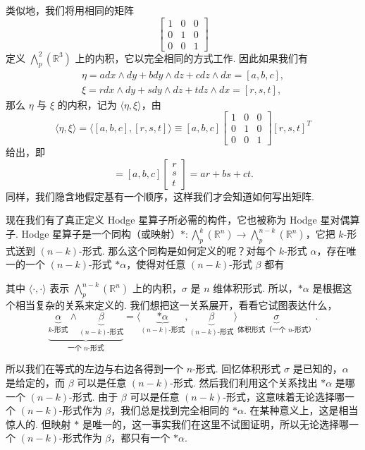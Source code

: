 类似地，我们将用相同的矩阵
\[
\begin{bmatrix}
1 & 0 & 0\\
0 & 1 & 0\\
0 & 0 & 1
\end{bmatrix}
\]
定义 $\bigwedge_p^2(\mathbb{R}^3)$ 上的内积，它以完全相同的方式工作. 因此如果我们有
\begin{align*}
\eta=adx\wedge dy+bdy\wedge dz+cdz\wedge dx=[a,b,c], \\
\xi=rdx\wedge dy+sdy\wedge dz+tdz\wedge dx=[r,s,t],
\end{align*}
那么 $\eta$ 与 $\xi$ 的内积，记为 $\langle\eta,\xi\rangle$，由
\[
\langle\eta,\xi\rangle=\langle[a,b,c],[r,s,t]\rangle
\equiv[a,b,c]
\begin{bmatrix}
1 & 0 & 0\\
0 & 1 & 0\\
0 & 0 & 1
\end{bmatrix}
[r,s,t]^T
\]
给出，即
\[
=[a,b,c]\begin{bmatrix}r\\s\\t\end{bmatrix}
=ar+bs+ct.
\]
同样，我们隐含地假定基有一个顺序，这样我们才会知道如何写出矩阵.

现在我们有了真正定义 Hodge 星算子所必需的构件，它也被称为 Hodge 星对偶算子. Hodge 星算子是一个同构（或映射）$\ast:\bigwedge_p^k(\mathbb{R}^n)\to\bigwedge_p^{n-k}(\mathbb{R}^n)$，它把 $k$-形式送到 $(n-k)$-形式. 那么这个同构是如何定义的呢？对每个 $k$-形式 $\alpha$，存在唯一的一个 $(n-k)$-形式 $\ast\alpha$，使得对任意 $(n-k)$-形式 $\beta$ 都有
\begin{center}
\end{center}
其中 $\langle\cdot,\cdot\rangle$ 表示 $\bigwedge_p^{n-k}(\mathbb{R}^n)$ 上的内积，$\sigma$ 是 $n$ 维体积形式. 所以，$\ast\alpha$ 是根据这个相当复杂的关系来定义的. 我们想把这一关系展开，看看它试图表达什么，
\[
\underbrace{\underbrace{\alpha}_{k\text{-形式}}\wedge\underbrace{\beta}_{(n-k)\text{-形式}}}_{\text{一个 }n\text{-形式}}
=
\langle\underbrace{\ast\alpha}_{(n-k)\text{-形式}},\underbrace{\beta}_{(n-k)\text{-形式}}\rangle
\underbrace{\sigma}_{\text{体积形式（一个 }n\text{-形式）}}.
\]

所以我们在等式的左边与右边各得到一个 $n$-形式. 回忆体积形式 $\sigma$ 是已知的，$\alpha$ 是给定的，而 $\beta$ 可以是任意 $(n-k)$-形式. 然后我们利用这个关系找出 $\ast\alpha$ 是哪一个 $(n-k)$-形式. 由于 $\beta$ 可以是任意 $(n-k)$-形式，这意味着无论选择哪一个 $(n-k)$-形式作为 $\beta$，我们总是找到完全相同的 $\ast\alpha$. 在某种意义上，这是相当惊人的. 但映射 $\ast$ 是唯一的，这一事实我们在这里不试图证明，所以无论选择哪一个 $(n-k)$-形式作为 $\beta$，都只有一个 $\ast\alpha$.

